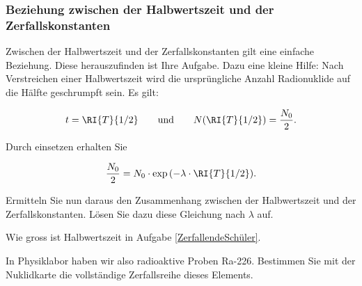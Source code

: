 \documentclass[12pt,a4paper,twoside]{article}
\begin{document}
\subsubsection*{Beziehung zwischen der Halbwertszeit und der Zerfallskonstanten}
Zwischen der Halbwertszeit und der Zerfallskonstanten gilt eine einfache Beziehung. 
Diese herauszufinden ist Ihre Aufgabe. Dazu eine kleine Hilfe: 
Nach Verstreichen einer Halbwertszeit wird die ursprüngliche Anzahl Radionuklide auf die Hälfte geschrumpft sein. Es gilt:

\begin{eqnarray*}
	t=\RI{T}{1/2}\qquad\text{und}\qquad N(\RI{T}{1/2}) =\frac{N_0}{2}\text{.}
\end{eqnarray*}



Durch einsetzen erhalten Sie

\begin{eqnarray*}
	\frac{N_0}{2}=N_0\cdot \exp{(-\lambda\cdot\RI{T}{1/2})}\text{.}
\end{eqnarray*}

\begin{aufgabe}
Ermitteln Sie nun daraus den Zusammenhang zwischen der Halbwertszeit und der Zerfallskonstanten. 
Lösen Sie dazu diese Gleichung nach $\lambda$ auf.
\end{aufgabe}



\begin{aufgabe}
	Wie gross ist Halbwertszeit in Aufgabe \ref{ZerfallendeSchüler}.
\end{aufgabe}


\begin{aufgabe}
	In Physiklabor haben wir also radioaktive Proben Ra-226.
	Bestimmen Sie mit der Nuklidkarte die vollständige Zerfallsreihe dieses Elements.
\end{aufgabe}
\end{document}
